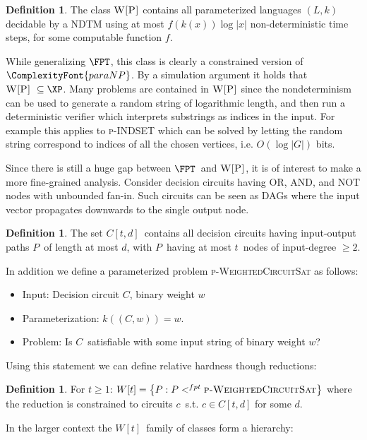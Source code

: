 \documentclass[a4paper,11pt]{report}
\theoremstyle{plain}
\theoremstyle{definition}
\newtheorem{defn}[thm]{Definition} %
\newcommand{\PARANP}{\ComplexityFont{paraNP}}
\begin{document}
\begin{defn}
The class $\textsc{W[P]}$ contains all parameterized languages $(L, k)$ decidable by a NDTM using at most $f(k(x)) \log |x| $ non-deterministic time steps, for some computable function $f$.
\end{defn}

While generalizing $\FPT$, this class is clearly a constrained version of $\PARANP$.
By a simulation argument \cite{FG06} it holds that $\textsc{W[P]} \subseteq \XP$.
Many problems are contained in $\textsc{W[P]}$ since the nondeterminism can be used to generate a random string of logarithmic length, and then run a deterministic verifier which
interprets substrings as indices in the input.
For example this applies to \textsc{p-INDSET} which can be solved by letting the random string correspond to indices of all the chosen vertices, i.e. $O(\log |G|)$ bits.

Since there is still a huge gap between $\FPT$ and $\textsc{W[P]}$, it is of interest to make a more fine-grained analysis.
Consider decision circuits having OR, AND, and NOT nodes with unbounded fan-in.
Such circuits can be seen as DAGs where the input vector propagates downwards to the single output node.

\begin{defn}
The set $C[t, d]$ contains all decision circuits having input-output paths $P$ of length at most $d$, with $P$ having at most $t$ nodes of input-degree $\ge 2$.
\end{defn}

In addition we define a parameterized problem \textsc{p-WeightedCircuitSat} as follows:
\begin{itemize}
\item Input: Decision circuit $C$, binary weight $w$
\item Parameterization: $k((C, w)) = w$.
\item Problem: Is $C$ satisfiable with some input string of binary weight $w$?
\end{itemize}

Using this statement we can define relative hardness though reductions:

\begin{defn}
For $t \ge 1$: $W[t] = \left\{P : P <^{fpt} \textsc{p-WeightedCircuitSat} \right\}$ where the reduction is constrained to circuits $c$ s.t. $c \in C[t, d]$ for some $d$.
\end{defn}

In the larger context the $W[t]$ family of classes form a hierarchy:
\end{document}
